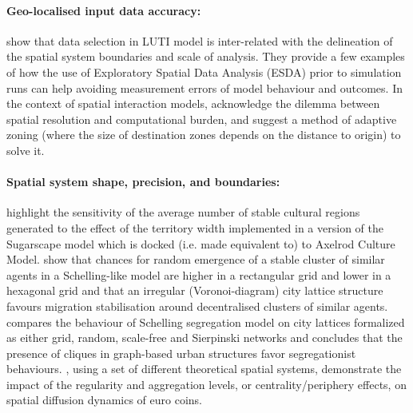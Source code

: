 \documentclass[Afour,sageh,times]{sagej}
\begin{document}
\paragraph{Geo-localised input data accuracy:} \citet{Thomasetal2017} show that data selection in LUTI model is inter-related with the delineation of the spatial system boundaries and scale of analysis. They provide a few examples of how the use of Exploratory Spatial Data Analysis (ESDA) prior to simulation runs can help avoiding measurement errors of model behaviour and outcomes. In the context of spatial interaction models, \citet{hagen2012new} acknowledge the dilemma between spatial resolution and computational burden, and suggest a method of adaptive zoning (where the size of destination zones depends on the distance to origin) to solve it.

\paragraph{Spatial system shape, precision, and boundaries:} \citet{Axtelletal1996} highlight the sensitivity of the average number of stable cultural regions generated to the effect of the territory width implemented in a version of the Sugarscape model which is docked (i.e. made equivalent to) to Axelrod Culture Model. \citet{FlacheHegselmann2001} show that chances for random emergence of a stable cluster of similar agents in a Schelling-like model are higher in a rectangular grid and lower in a hexagonal grid and that an irregular (Voronoi-diagram) city lattice structure favours migration stabilisation around decentralised clusters of similar agents. \citet{Banos2012} compares the behaviour of Schelling segregation model on city lattices formalized as either grid, random, scale-free and Sierpinski networks and concludes that the presence of cliques in graph-based urban structures favor segregationist behaviours. \citet{LeTexierCaruso2017}, using a set of different theoretical spatial systems, demonstrate the impact of the regularity and aggregation levels, or centrality/periphery effects, on spatial diffusion dynamics of euro coins. 
\end{document}
